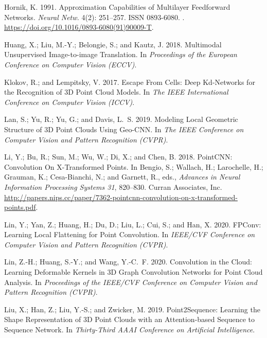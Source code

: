 \documentclass[letterpaper]{article} \usepackage{aaai21}  \usepackage{times}  \usepackage{helvet} \usepackage{courier}  \usepackage[hyphens]{url}  \usepackage{graphicx} \urlstyle{rm} \def\UrlFont{\rm}  \usepackage{natbib}  \usepackage{caption} \frenchspacing  \setlength{\pdfpagewidth}{8.5in}  \setlength{\pdfpageheight}{11in}  \usepackage{color}
\begin{document}
{\begin{thebibliography}{38}
Hornik, K. 1991.
\newblock Approximation Capabilities of Multilayer Feedforward Networks.
\newblock \emph{Neural Netw.} 4(2): 251–257.
\newblock ISSN 0893-6080.
\newblock {}.
\newblock \urlprefix\url{https://doi.org/10.1016/0893-6080(91)90009-T}.

Huang, X.; Liu, M.-Y.; Belongie, S.; and Kautz, J. 2018.
\newblock Multimodal Unsupervised Image-to-image Translation.
\newblock In \emph{Proceedings of the European Conference on Computer Vision
  (ECCV)}.

Klokov, R.; and Lempitsky, V. 2017.
\newblock Escape From Cells: Deep Kd-Networks for the Recognition of 3D Point
  Cloud Models.
\newblock In \emph{The IEEE International Conference on Computer Vision
  (ICCV)}.

Lan, S.; Yu, R.; Yu, G.; and Davis, L.~S. 2019.
\newblock Modeling Local Geometric Structure of 3D Point Clouds Using Geo-CNN.
\newblock In \emph{The IEEE Conference on Computer Vision and Pattern
  Recognition (CVPR)}.

Li, Y.; Bu, R.; Sun, M.; Wu, W.; Di, X.; and Chen, B. 2018.
\newblock PointCNN: Convolution On X-Transformed Points.
\newblock In Bengio, S.; Wallach, H.; Larochelle, H.; Grauman, K.;
  Cesa-Bianchi, N.; and Garnett, R., eds., \emph{Advances in Neural Information
  Processing Systems 31}, 820--830. Curran Associates, Inc.
\newblock
  \urlprefix\url{http://papers.nips.cc/paper/7362-pointcnn-convolution-on-x-transformed-points.pdf}.

Lin, Y.; Yan, Z.; Huang, H.; Du, D.; Liu, L.; Cui, S.; and Han, X. 2020.
\newblock FPConv: Learning Local Flattening for Point Convolution.
\newblock In \emph{IEEE/CVF Conference on Computer Vision and Pattern
  Recognition (CVPR)}.

Lin, Z.-H.; Huang, S.-Y.; and Wang, Y.-C.~F. 2020.
\newblock Convolution in the Cloud: Learning Deformable Kernels in 3D Graph
  Convolution Networks for Point Cloud Analysis.
\newblock In \emph{Proceedings of the IEEE/CVF Conference on Computer Vision
  and Pattern Recognition (CVPR)}.

Liu, X.; Han, Z.; Liu, Y.-S.; and Zwicker, M. 2019{}.
\newblock Point2Sequence: Learning the Shape Representation of 3D Point Clouds
  with an Attention-based Sequence to Sequence Network.
\newblock In \emph{Thirty-Third AAAI Conference on Artificial Intelligence}.


\end{thebibliography}}
\end{document}
